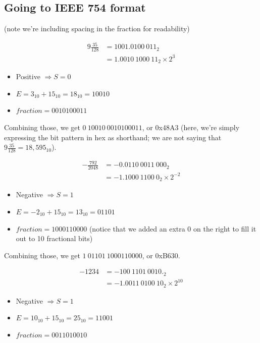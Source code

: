 \documentclass{article}
\begin{document}
\subsection{Going to IEEE 754 format}

(note we're including spacing in the fraction for readability)

\begin{align*}
9\frac{35}{128} &= 1001.0100\ 011_2 \\
                &= 1.0010\ 1000\ 11_2 \times 2^{3}
\end{align*}

\begin{itemize}
\item Positive $\Rightarrow S=0$
\item $E = 3_{10} + 15_{10} = 18_{10} = 10010$
\item $fraction = 0010100011$
\end{itemize}

Combining those, we get $0\ 10010\ 0010100011$, or 0x48A3 (here, we're simply
expressing the bit pattern in hex as shorthand; we are not saying that
$9\frac{35}{128} = 18,595_{10}$).

\vspace{1.5cm}

\begin{align*}
-\frac{792}{2048}   &= -0.0110\ 0011\ 000_2 \\
                    &= -1.1000\ 1100\ 0_2 \times 2^{-2}
\end{align*}

\begin{itemize}
\item Negative $\Rightarrow S=1$
\item $E = -2_{10} + 15_{10} = 13_{10} = 01101$
\item $fraction = 1000110000$ (notice that we added an extra 0 on the right to
    fill it out to 10 fractional bits)
\end{itemize}

Combining those, we get $1\ 01101\ 1000110000$, or 0xB630.

\vspace{1.5cm}

\begin{align*}
-1234   &= -100\ 1101\ 0010._2 \\
        &= -1.0011\ 0100\ 10_2 \times 2^{10}
\end{align*}

\begin{itemize}
\item Negative $\Rightarrow S=1$
\item $E = 10_{10} + 15_{10} = 25_{10} = 11001$
\item $fraction = 0011010010$
\end{itemize}
\end{document}
